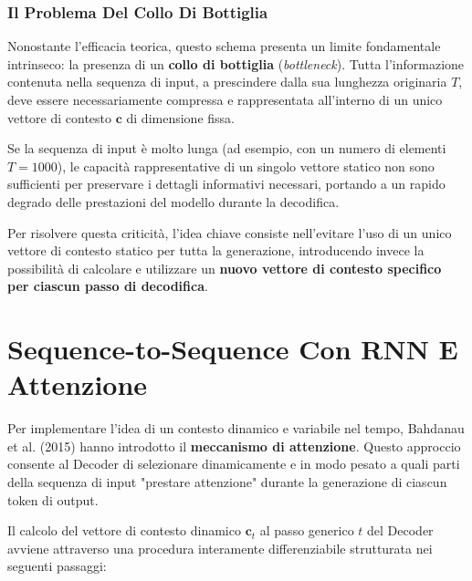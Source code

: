﻿\documentclass[11pt, a4paper]{article}
\begin{document}
\subsubsection{Il Problema Del Collo Di Bottiglia}

Nonostante l'efficacia teorica, questo schema presenta un limite fondamentale intrinseco: la presenza di un \textbf{collo di bottiglia} (\emph{bottleneck}). Tutta l'informazione contenuta nella sequenza di input, a prescindere dalla sua lunghezza originaria $T$, deve essere necessariamente compressa e rappresentata all'interno di un unico vettore di contesto $\bm{c}$ di dimensione fissa.

Se la sequenza di input è molto lunga (ad esempio, con un numero di elementi $T = 1000$), le capacità rappresentative di un singolo vettore statico non sono sufficienti per preservare i dettagli informativi necessari, portando a un rapido degrado delle prestazioni del modello durante la decodifica.

Per risolvere questa criticità, l'idea chiave consiste nell'evitare l'uso di un unico vettore di contesto statico per tutta la generazione, introducendo invece la possibilità di calcolare e utilizzare un \textbf{nuovo vettore di contesto specifico per ciascun passo di decodifica}.


\newpage

\section{Sequence-to-Sequence Con RNN E Attenzione}

Per implementare l'idea di un contesto dinamico e variabile nel tempo, Bahdanau et al. (2015) hanno introdotto il \textbf{meccanismo di attenzione}. Questo approccio consente al Decoder di selezionare dinamicamente e in modo pesato a quali parti della sequenza di input "prestare attenzione" durante la generazione di ciascun token di output.


Il calcolo del vettore di contesto dinamico $\bm{c}_t$ al passo generico $t$ del Decoder avviene attraverso una procedura interamente differenziabile strutturata nei seguenti passaggi:
\end{document}
